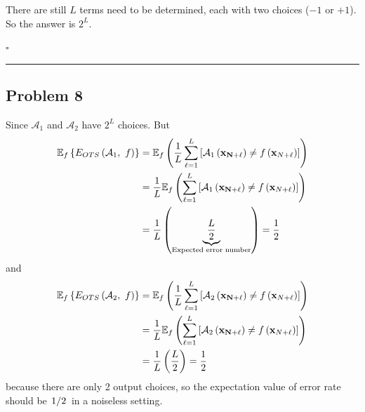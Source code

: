 \documentclass[12pt]{article}
\newcommand*{\QEDB}{\hfill\ensuremath{\square}}
\newcommand{\CBrackets}[1]{\left\{#1\right\}}
\newcommand{\SBrackets}[1]{\left[#1\right]}
\newcommand{\ParTh}[1]{\left(#1\right)}
\newcommand{\BF}[1]{{\bf#1}}
\newcommand{\Divide}[2]{\left.#1\middle/#2\right.}
\newcommand{\horrule}[1]{\rule{\linewidth}{#1}}
\begin{document}
There are still $L$ terms need to be determined, each with two choices ($-1$ or $+1$). So the answer is $2^L$.

\QEDB

\horrule{0.5pt}

\subsection*{Problem 8}

Since $\mathcal{A}_1$ and $\mathcal{A}_2$ have $2^L$ choices. But
\begin{align}
\mathbb{E}_f\CBrackets{E_{OTS}\ParTh{\mathcal{A}_1,~f}}&=\mathbb{E}_f\ParTh{\dfrac{1}{L}\sum_{\ell=1}^{L}\SBrackets{\mathcal{A}_1\ParTh{\BF{x_{N+\ell}}}\neq f\ParTh{\BF{x}_{N+\ell}}}}
\\
&=\dfrac{1}{L}\mathbb{E}_f\ParTh{\sum_{\ell=1}^{L}\SBrackets{\mathcal{A}_1\ParTh{\BF{x_{N+\ell}}}\neq f\ParTh{\BF{x}_{N+\ell}}}}\\
&=\dfrac{1}{L}\ParTh{\underbrace{\dfrac{L}{2}}_{\text{Expected error number}}}=\dfrac{1}{2}
\end{align}
and
\begin{align}
\mathbb{E}_f\CBrackets{E_{OTS}\ParTh{\mathcal{A}_2,~f}}&=\mathbb{E}_f\ParTh{\dfrac{1}{L}\sum_{\ell=1}^{L}\SBrackets{\mathcal{A}_2\ParTh{\BF{x_{N+\ell}}}\neq f\ParTh{\BF{x}_{N+\ell}}}}
\\
&=\dfrac{1}{L}\mathbb{E}_f\ParTh{\sum_{\ell=1}^{L}\SBrackets{\mathcal{A}_2\ParTh{\BF{x_{N+\ell}}}\neq f\ParTh{\BF{x}_{N+\ell}}}}\\
&=\dfrac{1}{L}\ParTh{\dfrac{L}{2}}=\dfrac{1}{2}
\end{align}
because there are only 2 output choices, so the expectation value of error rate should be $\Divide{1}{2}$ in a noiseless setting.
\end{document}
